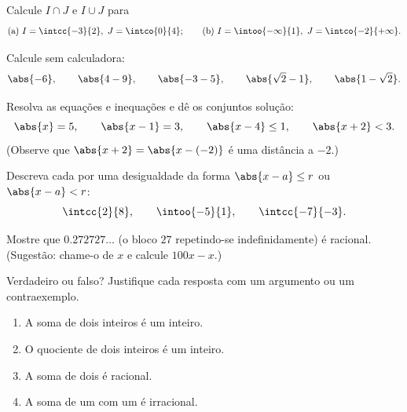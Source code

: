 \begin{exercise}[$\star$]\label{exo:g10:numbers:3}
Calcule $I \cap J$ e $I \cup J$ para
\[
\text{(a) } I = \intcc{-3}{2},\ J = \intco{0}{4};
\qquad
\text{(b) } I = \intoo{-\infty}{1},\ J = \intco{-2}{+\infty}.
\]
\end{exercise}

\begin{exercise}[$\star$]\label{exo:g10:numbers:4}
Calcule sem calculadora:
\[
\abs{-6}, \qquad \abs{4 - 9}, \qquad \abs{-3 - 5}, \qquad
\abs{\sqrt 2 - 1}, \qquad \abs{1 - \sqrt 2}.
\]
\end{exercise}

\begin{exercise}[$\star$]\label{exo:g10:numbers:5}
Resolva as equações e inequações e dê os conjuntos solução:
\[
\abs{x} = 5, \qquad \abs{x - 1} = 3, \qquad \abs{x - 4} \leq 1, \qquad
\abs{x + 2} < 3 .
\]
(Observe que $\abs{x+2} = \abs{x - (-2)}$ é uma distância a $-2$.)
\end{exercise}

\begin{exercise}[$\star\star$]\label{exo:g10:numbers:6}
Descreva cada  por uma desigualdade da forma
$\abs{x - a} \leq r$ ou $\abs{x - a} < r$:
\[
\intcc{2}{8}, \qquad \intoo{-5}{1}, \qquad \intcc{-7}{-3}.
\]
\end{exercise}

\begin{exercise}[$\star\star$]\label{exo:g10:numbers:7}
Mostre que $0.272727\dots$ (o bloco $27$ repetindo-se indefinidamente) é
racional. (Sugestão: chame-o de $x$ e calcule $100x - x$.)
\end{exercise}

\begin{exercise}[$\star\star$]\label{exo:g10:numbers:8}
Verdadeiro ou falso? Justifique cada resposta com um argumento ou um
contraexemplo.
\begin{enumerate}
  \item A soma de dois inteiros é um inteiro.
  \item O quociente de dois inteiros é um inteiro.
  \item A soma de dois  é racional.
  \item A soma de um  com um  é
        irracional.
\end{enumerate}
\end{exercise}

